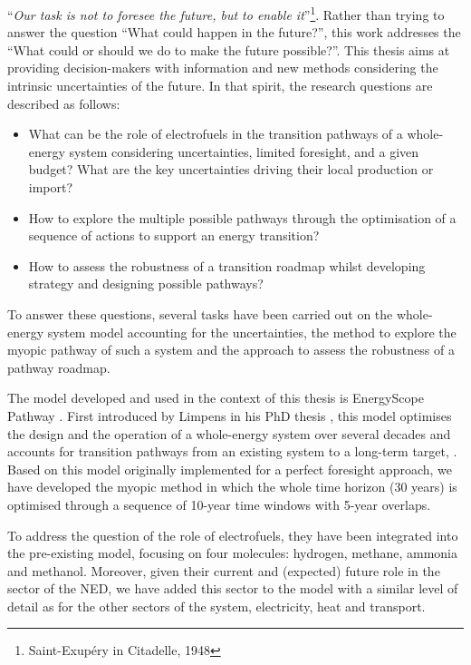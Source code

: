 \noindent
``\textit{Our task is not to foresee the future, but to enable it}''\footnote{Saint-Exupéry in Citadelle, 1948}. Rather than trying to answer the question ``What could happen in the future?'', this work addresses the ``What could or should we do to make the future possible?''. This thesis aims at providing decision-makers with information and new methods considering the intrinsic uncertainties of the future.  In that spirit, the research questions are described as follows:
\begin{itemize}
\item What can be the role of electrofuels in the transition pathways of a whole-energy system considering uncertainties,  limited foresight, and a given  budget? What are the key uncertainties driving their local production or import?
\item How to explore the multiple possible pathways through the optimisation of a sequence of actions to support an energy transition?
\item How to assess the robustness of a transition roadmap whilst developing strategy and designing possible pathways?
\end{itemize}

To answer these questions, several tasks have been carried out on the whole-energy system model accounting for the uncertainties, the method to explore the myopic pathway of such a system and the approach to assess the robustness of a pathway roadmap. 

The model developed and used in the context of this thesis is EnergyScope Pathway \cite{limpens2024pathway}. First introduced by Limpens in his PhD thesis \cite{limpens2021generating}, this model optimises the design and the operation of a whole-energy system over several decades and accounts for transition pathways from an existing system to a long-term target, . Based on this model originally implemented for a perfect foresight approach, we have developed the myopic method in which the whole time horizon (30 years) is optimised through a sequence of 10-year time windows with 5-year overlaps.

To address the question of the role of electrofuels, they have been integrated into the pre-existing model, focusing on four molecules: hydrogen, methane, ammonia and methanol. Moreover, given their current and (expected) future role in the sector of the \gls{NED}, we have added this sector to the model with a similar level of detail as for the other sectors of the system, \ie electricity, heat and transport. 

